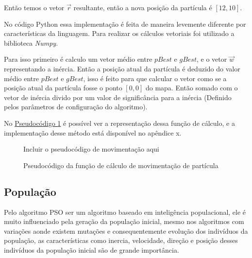                 \noindent Então temos o vetor $\vec r$ resultante, então a nova posição da partícula é $[12,10]$.
                
                No código Python essa implementação é feita de maneira levemente diferente por características da linguagem. Para realizar os cálculos vetoriais foi utilizado a biblioteca \textit{Numpy}.\hfill\vspace{\onelineskip}
                
                Para isso primeiro é calculo um vetor médio entre $pBest$ e $gBest$, e o vetor $\vec w$ representando a inércia.\newline
                Então a posição atual da partícula é deduzido do valor médio entre $pBest$ e $gBest$, isso é feito para que calcular o vetor como se a posição atual da partícula fosse o ponto $[0,0]$ do mapa.\newline
                Então somado com o vetor de inércia divido por um valor de significância para a inércia (Definido pelos parâmetros de configuração do algoritmo).\hfill\vspace{\onelineskip}

                No \hyperref[cod:new-posicao]{Pseudocódigo \ref{cod:new-posicao}} é possível ver a representação dessa função de cálculo, e a implementação desse método está disponível no apêndice x.
                
                \begin{figure}[ht]
                    \centering
                    \small{Incluir o pseudocódigo de movimentação aqui}
                    \caption{Pseudocódigo da função de cálculo de movimentação de partícula}
                    \label{cod:new-posicao}
                \end{figure}






    \subsection{População}
        Pelo algoritmo PSO ser um algoritmo baseado em inteligência populacional, ele é muito influenciado pela geração da população inicial, mesmo nos algoritmos com variações aonde existem mutações e consequentemente evolução dos indivíduos da população, as características como inercia, velocidade, direção e posição desses indivíduos da população inicial são de grande importância.\hfill\vspace{\onelineskip}

